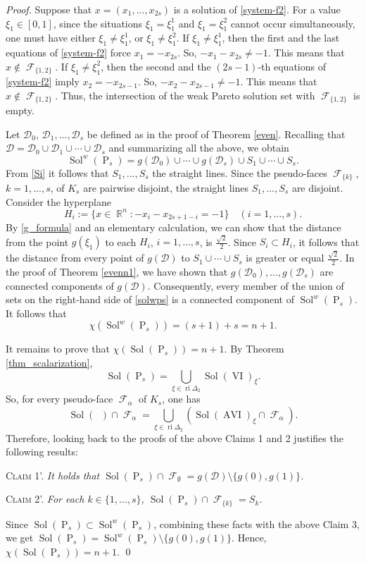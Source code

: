 \documentclass[smallextended,envcountsect]{svjour3}       %
\DeclareMathOperator{\Sol}{Sol}
\DeclareMathOperator{\AVI}{AVI}
\DeclareMathOperator{\Pa}{P}
\DeclareMathOperator{\Ptwo}{P_s}
\DeclareMathOperator{\VI}{VI}
\DeclareMathOperator{\ri}{ri}
\DeclareMathOperator{\R}{\mathbb{R}}
\DeclareMathOperator{\F}{\mathcal{F}}
\begin{document}
\begin{proof}
Suppose that $x=(x_1,...,x_{2s})$ is a solution of \eqref{system-f2}. For a value $\xi_1\in [0,1]$, since the situations $\xi_1=\xi_1^1$ and $\xi_1=\xi_1^2$ cannot occur simultaneously, one must have either $\xi_1\neq \xi_1^1$, or $\xi_1\neq \xi_1^2$. If $\xi_1\neq \xi_1^1$, then the first and the last equations  of \eqref{system-f2} force $x_{1}=-x_{2s}$. So, $-x_1-x_{2s}\neq-1$. This means that  $x\notin\F_{\{1,2\}}$. If $\xi_1\neq \xi_1^2$, then the second and the $(2s-1)$-th equations of \eqref{system-f2} imply $x_2=-x_{2s-1}$. So, $-x_2-x_{2s-1}\neq-1$. This means that $x\notin\F_{\{1,2\}}$. Thus, the intersection of the weak Pareto solution set with $\F_{\{1,2\}}$ is empty. 

Let $\mathcal{D}_0,\, \mathcal{D}_1,...,\mathcal{D}_s$ be defined as in the proof of Theorem \ref{even}. Recalling that $\mathcal{D}=\mathcal{D}_0\cup \mathcal{D}_1\cup \cdots \cup \mathcal{D}_s$ and summarizing all the above, we obtain
\begin{equation}\label{solwps}
	\Sol^w(\Pa_s)=g(\mathcal{D}_0)\cup\cdots\cup g(\mathcal{D}_s)\cup  S_1\cup\cdots\cup S_s.
	\end{equation}
From \eqref{Si} it follows that $S_1, ...,S_s$ the straight lines. Since the  pseudo-faces $\F_{\{k\}}$, $k=1,...,s$, of $K_s$ are pairwise disjoint, the straight lines $S_1, ...,S_s$ are disjoint. Consider the hyperplane $$H_i:=\{x\in\R^n:-x_i-x_{2s+1-i}=-1\}\quad (i=1,...,s).$$ By \eqref{g_formula} and an elementary calculation, we can show that the distance from the point $g(\xi_1)$ to each $H_i$, $i=1,...,s$, is $\frac{\sqrt{2}}{2}$. Since $S_i\subset H_i$, it follows that the distance from every point of $g(\mathcal{D})$ to $S_1\cup\cdots\cup S_s$ is greater or equal $\frac{\sqrt{2}}{2}$. In the proof of Theorem \ref{evenn1}, we have shown that $g(\mathcal{D}_0),..., g(\mathcal{D}_s)$ are connected components of $g(\mathcal{D})$. Consequently, every member of the union of sets on the right-hand side of \eqref{solwps} is a connected component of $\Sol^w(\Pa_s)$. It follows that $$\chi(\Sol^w(\Pa_s))=(s+1)+s=n+1.$$
	
It remains to prove that $\chi(\Sol(\Pa_s))= n+1.$ By Theorem \ref{thm_scalarization}, 
	\begin{equation*} \Sol(\Pa_s)=\bigcup_{\xi\in{\ri}\Delta_2}{\Sol(\VI)}_\xi. \end{equation*} So, for every pseudo-face $\F_{\alpha}$ of $K_s$, one has
	$$\Sol(\Ptwo)\cap \F_{\alpha}=\bigcup_{\xi\in \ri\Delta_2}({\Sol(\AVI)}_\xi\cap \F_{\alpha}).$$
	Therefore, looking back to the proofs of the above Claims 1 and 2 justifies the following results:
	
	\smallskip
	\noindent \textsc{Claim 1'.} \textit{It holds that $\Sol(\Pa_s)\cap \F_{\emptyset}=g(\mathcal{D})\setminus\{g(0),g(1)\}$.}
	
	\smallskip
	\noindent \textsc{Claim 2'.} \textit{For each $k\in\{1,...,s\}$, $\Sol(\Pa_s)\cap \F_{\{k\}}=S_k$.}
	
	\smallskip
	Since $\Sol(\Pa_s)\subset \Sol^w(\Pa_s)$, combining these facts with the above Claim 3, we get $\Sol(\Pa_s)=\Sol^w(\Pa_s)\setminus\{g(0),g(1)\}$. Hence, $\chi(\Sol(\Pa_s))=n+1.$ \qed
\end{proof}
\end{document}
